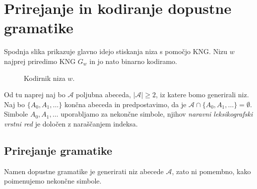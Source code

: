 \documentclass[fin1, tisk]{fmfdelo}
\providecommand{\abs}[1]{\left\lvert #1 \right\rvert}
\newcommand{\A}{\mathcal{A}}
\theoremstyle{definition}
\begin{document}
\section{Prirejanje in kodiranje dopustne gramatike} 

Spodnja slika prikazuje glavno idejo stiskanja niza s pomočjo KNG.
Nizu $w$ najprej priredimo KNG $G_w$ in jo nato binarno kodiramo.

\begin{figure}[H]
    \centering
    \caption{Kodirnik niza $w$.}
    \label{fig:Kodirnik}
\end{figure}

Od tu naprej naj bo $\A$ poljubna abeceda, $\abs{\A} \geq 2$, iz katere bomo generirali niz.
Naj bo $\{ A_0, A_1, \ldots \}$ končna abeceda in predpostavimo, da je
$\A \cap \{ A_0, A_1, \ldots \} = \emptyset$. Simbole $A_0, A_1, \ldots$ uporabljamo za nekončne 
simbole, njihov \emph{naravni leksikografski vrstni red} je določen z naraščanjem indeksa.

\subsection{Prirejanje gramatike}

Namen dopustne gramatike je generirati niz abecede $\A$, zato ni
pomembno, kako poimenujemo nekončne simbole.
\end{document}

